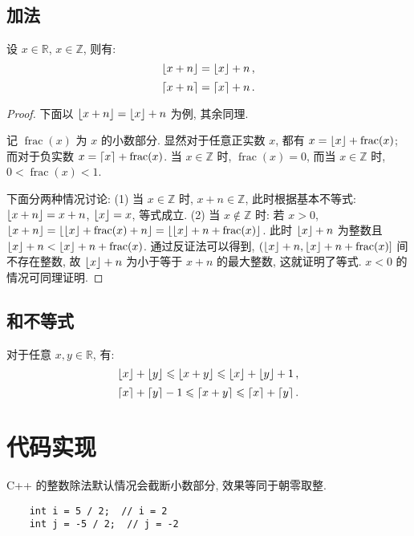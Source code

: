 \documentclass[UTF8]{ctexart}
\newcommand{\R}{\mathbb R}
\newcommand{\Z}{\mathbb Z}
\DeclarePairedDelimiter\Floor{\lfloor}{\rfloor}
\DeclarePairedDelimiter\Ceil{\lceil}{\rceil}
\DeclareMathOperator{\Frac}{frac}
\begin{document}
\subsection{加法}
设 $ x \in \R $, $ x \in \Z $, 则有:
\[ 
    \Floor{x + n} = \Floor{x} + n \,,
\]
\[ 
    \Ceil{x + n} = \Ceil{x} + n \,.
\]
\begin{proof} 
    下面以 $ \Floor{x + n} = \Floor{x} + n $ 为例, 其余同理.
    
    记 $ \Frac(x) $ 为 $ x $ 的小数部分. 显然对于任意正实数 $ x $, 都有 $ x = \Floor{x} + \Frac(x) $; 而对于负实数 $ x = \Ceil{x} + \Frac(x) $. 当 $ x \in \Z $ 时, $ \Frac(x) = 0 $, 而当 $ x \in \Z $ 时, $ 0 < \Frac(x) < 1 $.

    下面分两种情况讨论: (1) 当 $ x \in \Z $ 时, $ x + n \in \Z $, 此时根据基本不等式: $ \Floor{x + n} = x + n $, $ \Floor{x} = x $, 等式成立. (2) 当 $ x \notin \Z $ 时: 若 $ x > 0 $, $ \Floor{x + n} = \Floor{\Floor{x} + \Frac(x) + n} = \Floor{\Floor{x} + n + \Frac(x)} $. 此时 $ \Floor{x} + n $ 为整数且 $ \Floor{x} + n < \Floor{x} + n + \Frac(x) $. 通过反证法可以得到, $ (\Floor{x} + n , \Floor{x} + n + \Frac(x)] $ 间不存在整数, 故 $ \Floor{x} + n $ 为小于等于 $ x + n $ 的最大整数, 这就证明了等式. $ x < 0 $ 的情况可同理证明.
\end{proof}

\subsection{和不等式}
对于任意 $ x, y \in \R $, 有:
\[ 
    \Floor{x} + \Floor{y} \leqslant \Floor{x + y} \leqslant \Floor{x} + \Floor{y} + 1 \,,
\]
\[ 
    \Ceil{x} + \Ceil{y} - 1 \leqslant \Ceil{x + y} \leqslant \Ceil{x} + \Ceil{y} \,.
\]



\section{代码实现}
C++ 的整数除法默认情况会截断小数部分, 效果等同于朝零取整.
\begin{verbatim}
    int i = 5 / 2;  // i = 2
    int j = -5 / 2;  // j = -2
\end{verbatim}
\end{document}
